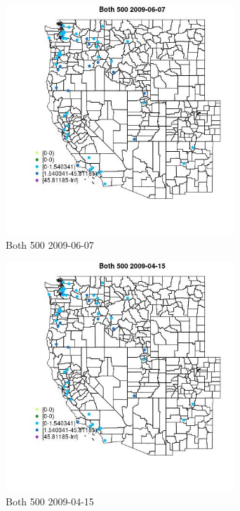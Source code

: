 \begin{figure} 
\centering  
\includegraphics[width=0.77\textwidth]{Code_Outputs/Report_ML_input_PM25_Step4_part_e_de_duplicated_aves_MapObsBoth_5002009-06-07.jpg} 
\caption{\label{fig:Report_ML_input_PM25_Step4_part_e_de_duplicated_avesMapObsBoth_5002009-06-07}Both 500 2009-06-07} 
\end{figure} 
 

\clearpage 

\begin{figure} 
\centering  
\includegraphics[width=0.77\textwidth]{Code_Outputs/Report_ML_input_PM25_Step4_part_e_de_duplicated_aves_MapObsBoth_5002009-04-15.jpg} 
\caption{\label{fig:Report_ML_input_PM25_Step4_part_e_de_duplicated_avesMapObsBoth_5002009-04-15}Both 500 2009-04-15} 
\end{figure} 
 

